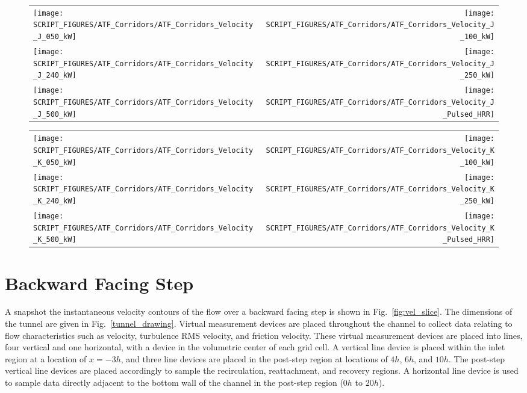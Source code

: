\begin{figure}[p]
\begin{tabular*}{\textwidth}{l@{\extracolsep{\fill}}r}
\texttt{[image: SCRIPT\_FIGURES/ATF\_Corridors/ATF\_Corridors\_Velocity\_J\_050\_kW]} &
\texttt{[image: SCRIPT\_FIGURES/ATF\_Corridors/ATF\_Corridors\_Velocity\_J\_100\_kW]} \\
\texttt{[image: SCRIPT\_FIGURES/ATF\_Corridors/ATF\_Corridors\_Velocity\_J\_240\_kW]} &
\texttt{[image: SCRIPT\_FIGURES/ATF\_Corridors/ATF\_Corridors\_Velocity\_J\_250\_kW]} \\
\texttt{[image: SCRIPT\_FIGURES/ATF\_Corridors/ATF\_Corridors\_Velocity\_J\_500\_kW]} &
\texttt{[image: SCRIPT\_FIGURES/ATF\_Corridors/ATF\_Corridors\_Velocity\_J\_Pulsed\_HRR]}
\end{tabular*}
\label{ATF_Velocity_J}
\end{figure}

\begin{figure}[p]
\begin{tabular*}{\textwidth}{l@{\extracolsep{\fill}}r}
\texttt{[image: SCRIPT\_FIGURES/ATF\_Corridors/ATF\_Corridors\_Velocity\_K\_050\_kW]} &
\texttt{[image: SCRIPT\_FIGURES/ATF\_Corridors/ATF\_Corridors\_Velocity\_K\_100\_kW]} \\
\texttt{[image: SCRIPT\_FIGURES/ATF\_Corridors/ATF\_Corridors\_Velocity\_K\_240\_kW]} &
\texttt{[image: SCRIPT\_FIGURES/ATF\_Corridors/ATF\_Corridors\_Velocity\_K\_250\_kW]} \\
\texttt{[image: SCRIPT\_FIGURES/ATF\_Corridors/ATF\_Corridors\_Velocity\_K\_500\_kW]} &
\texttt{[image: SCRIPT\_FIGURES/ATF\_Corridors/ATF\_Corridors\_Velocity\_K\_Pulsed\_HRR]}
\end{tabular*}
\label{ATF_Velocity_K}
\end{figure}


\clearpage

\section{Backward Facing Step}

A snapshot the instantaneous velocity contours of the flow over a backward facing step is shown in Fig.~\ref{fig:vel_slice}. The dimensions of the tunnel are given in Fig.~\ref{tunnel_drawing}. Virtual measurement devices are placed throughout the channel to collect data relating to flow characteristics such as velocity, turbulence RMS velocity, and friction velocity.  These virtual measurement devices are placed into lines, four vertical and one horizontal, with a device in the volumetric center of each grid cell.  A vertical line device is placed within the inlet region at a location of $x=-3h$, and three line devices are placed in the post-step region at locations of $4h$, $6h$, and $10h$. The post-step vertical line devices are placed accordingly to sample the recirculation, reattachment, and recovery regions.  A horizontal line device is used to sample data directly adjacent to the bottom wall of the channel in the post-step region ($0h$ to $20h$).

